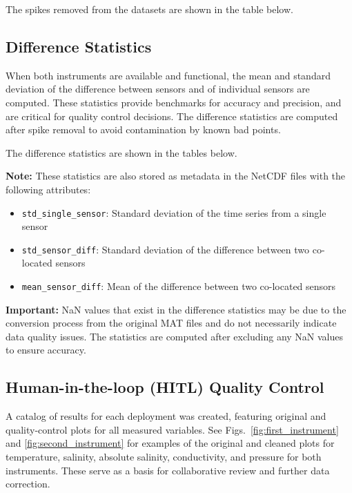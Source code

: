 \documentclass[11pt]{article}
\begin{document}
The spikes removed from the datasets are shown in the table below.



\subsection{Difference Statistics}
When both instruments are available and functional, 
the mean and standard deviation of the difference between sensors and of individual sensors are computed. 
These statistics provide benchmarks for accuracy and precision, and are critical for quality control decisions.
The difference statistics are computed after spike removal to avoid contamination by known bad points.

The difference statistics are shown in the tables below.



\textbf{Note:} These statistics are also stored as metadata in the NetCDF files with the following attributes:
\begin{itemize}
\item \texttt{std\_single\_sensor}: Standard deviation of the time series from a single sensor
\item \texttt{std\_sensor\_diff}: Standard deviation of the difference between two co-located sensors
\item \texttt{mean\_sensor\_diff}: Mean of the difference between two co-located sensors
\end{itemize}

\textbf{Important:} NaN values that exist in the difference statistics may be due to the conversion process from the original MAT files and do not necessarily indicate data quality issues. The statistics are computed after excluding any NaN values to ensure accuracy.

\subsection{Human-in-the-loop (HITL) Quality Control}
A catalog of results for each deployment was created, featuring original and quality-control plots for all measured variables. 
See Figs.~\ref{fig:first_instrument} and \ref{fig:second_instrument} for examples of the original and cleaned plots for temperature, salinity, absolute salinity, conductivity, and pressure for both instruments.
These serve as a basis for collaborative review and further data correction.
\end{document}
